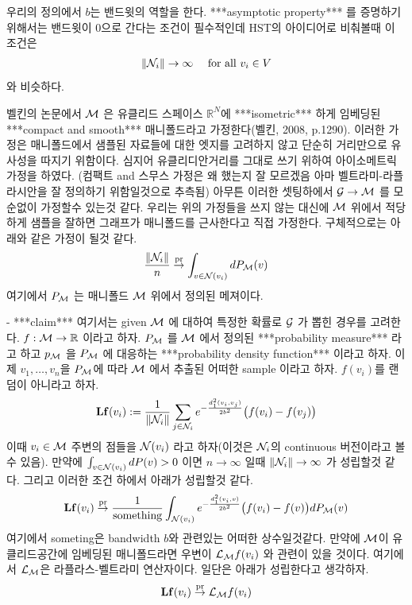\documentclass[preprint, review, 12pt]{article}
\theoremstyle{definition}
\theoremstyle{remark}
\begin{document}
우리의 정의에서 $b$는 밴드윗의 역할을 한다. ***asymptotic property*** 를 증명하기 위해서는 밴드윗이 0으로 간다는 조건이 필수적인데 HST의 아이디어로 비춰볼때 이 조건은 
\begin{align}
\|{\cal N}_ i\|\to \infty \quad \mbox{ for all } v_i \in V
\end{align}
와 비슷하다. 

벨킨의 논문에서 ${\cal M}$ 은 유클리드 스페이스 $\mathbb{R}^{N}$에 ***isometric*** 하게 임베딩된 ***compact and smooth*** 매니폴드라고 가정한다(벨킨, 2008, p.1290). 이러한 가정은 매니폴드에서 샘플된 자료들에 대한 엣지를 고려하지 않고 단순히 거리만으로 유사성을 따지기 위함이다. 심지어 유클리디안거리를 그대로 쓰기 위하여 아이소메트릭 가정을 하였다. (컴팩트 and 스무스 가정은 왜 했는지 잘 모르겠음 아마 벨트라미-라플라시안을 잘 정의하기 위함일것으로 추측됨) 아무튼 이러한 셋팅하에서 ${\cal G} \to {\cal M}$ 를 모순없이 가정할수 있는것 같다. 우리는 위의 가정들을 쓰지 않는 대신에 ${\cal M}$ 위에서 적당하게 샘플을 잘하면 그래프가 매니폴드를 근사한다고 직접 가정한다. 구체적으로는 아래와 같은 가정이 될것 같다. 
\begin{align}
\frac{\|{\cal N}_ i \|}{n} \overset{\operatorname{pr} }{\to} \int_{v \in {\cal N}(v_i)}dP_{\cal M}(v)
\end{align} 
여기에서 $P_{\cal M}$ 는 매니폴드 ${\cal M}$ 위에서 정의된 메져이다. 

- ***claim*** 여기서는 given ${\cal M}$ 에 대하여 특정한 확률로 ${\cal G}$ 가 뽑힌 경우를 고려한다. $f:{\cal M} \to \mathbb{R}$ 이라고 하자. $P_{\cal M}$ 를 ${\cal M}$ 에서 정의된 ***probability measure*** 라고 하고 $p_{\cal M}$ 을 $P_{\cal M}$ 에 대응하는 ***probability density function*** 이라고 하자. 이제 $v_1,\dots,v_n$을 $P_{\cal M}$에 따라 ${\cal M}$ 에서 추출된 어떠한 sample 이라고 하자. $f(v_i)$를  랜덤이 아니라고 하자. 
\begin{align}
{\bf Lf}(v_i):=\frac{1}{\|{\cal N}_ i\|}\sum_{j \in {\cal N}_ i} e^{ -\frac{d_1^2(v_i,v_j)}{2b^2} } \big(f(v_i)-f(v_j)\big)
\end{align}
이때 $v_i \in {\cal M}$ 주변의 점들을 ${\cal N}(v_i)$ 라고 하자(이것은 ${\cal N}_ i$의 continuous 버전이라고 볼 수 있음). 만약에 $\int_{v \in {\cal N}(v_i)} dP(v)>0$ 이면 $n \to \infty$ 일때 $\|{\cal N}_ i \| \to \infty$ 가 성립할것 같다.
그리고 이러한 조건 하에서 아래가 성립할것 같다. 
\begin{align}
{\bf Lf}(v_i) \overset{\operatorname{pr}}{\rightarrow}\frac{1}{\mbox{something} }\int_{ {\cal N}(v_i)} e^{ -\frac{d_1^2(v_i,v)}{2b^2} } \big(f(v_i)-f(v)\big)dP_{\cal M}(v)
\end{align}
여기에서 someting은 bandwidth $b$와 관련있는 어떠한 상수일것같다. 만약에 ${\cal M}$이 유클리드공간에 임베딩된 매니폴드라면 우변이 ${\cal L}_ {\cal M}f(v_i)$ 와 관련이 있을 것이다. 여기에서 ${\cal L}_ {\cal M}$은 라플라스-벨트라미 연산자이다. 일단은 아래가 성립한다고 생각하자. 
\begin{align}
{\bf Lf}(v_i) \overset{\operatorname{pr}}{\rightarrow} {\cal L}_ {\cal M}f(v_i)
\end{align}
\end{document}
